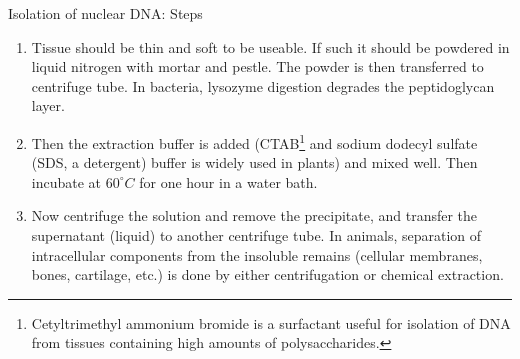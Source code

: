 \documentclass[11pt,dvipsnames,ignorenonframetext,aspectratio=169]{beamer}
\providecommand{\tightlist}{%
  \setlength{\itemsep}{0pt}\setlength{\parskip}{0pt}}
\begin{document}
\begin{frame}{Isolation of nuclear DNA: Steps}
\protect\hypertarget{isolation-of-nuclear-dna-steps}{}
\begin{enumerate}
\tightlist
\item
  Tissue should be thin and soft to be useable. If such it should be
  powdered in liquid nitrogen with mortar and pestle. The powder is then
  transferred to centrifuge tube. In bacteria, lysozyme digestion
  degrades the peptidoglycan layer.
\item
  Then the extraction buffer is added
  (CTAB\footnote[frame]{Cetyltrimethyl ammonium bromide is a surfactant useful for isolation of DNA from tissues containing high amounts of polysaccharides.}
  and sodium dodecyl sulfate (SDS, a detergent) buffer is widely used in
  plants) and mixed well. Then incubate at \(60^\circ C\) for one hour
  in a water bath.
\item
  Now centrifuge the solution and remove the precipitate, and transfer
  the supernatant (liquid) to another centrifuge tube. In animals,
  separation of intracellular components from the insoluble remains
  (cellular membranes, bones, cartilage, etc.) is done by either
  centrifugation or chemical extraction.
\end{enumerate}
\end{frame}
\end{document}
